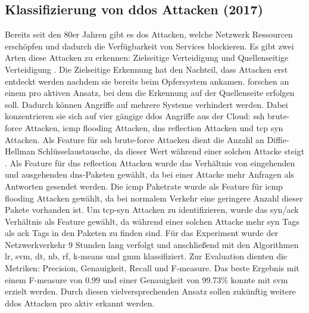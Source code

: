 \documentclass[
    12pt, %
    DIV10,
    ngerman, %
    a4paper, %
    oneside, %
    titlepage, %
    parskip=half, %
    headings=normal, %
    listof=totoc, %
    bibliography=totoc, %
    index=totoc, %
    captions=tableheading, %
    final %
]{scrreprt}
\begin{document}
\subsection{Klassifizierung von \acs{ddos} Attacken (2017)}
Bereits seit den 80er Jahren gibt es \ac{dos} Attacken, welche Netzwerk Ressourcen erschöpfen und dadurch die Verfügbarkeit von Services blockieren. Es gibt zwei Arten diese Attacken zu erkennen: Zielseitige Verteidigung und Quellenseitige Verteidigung \parencite{He2017}. Die Zielseitige Erkennung hat den Nachteil, dass Attacken erst entdeckt werden nachdem sie bereits beim Opfersystem ankamen. \textcite{He2017} forschen an einem pro aktiven Ansatz, bei dem die Erkennung auf der Quellenseite erfolgen soll. Dadurch können Angriffe auf mehrere Systeme verhindert werden. Dabei konzentrieren sie sich auf vier gängige \ac{ddos} Angriffe aus der Cloud: \ac{ssh} brute-force Attacken, \ac{icmp} flooding Attacken, \ac{dns} reflection Attacken und \ac{tcp} \ac{syn} Attacken. Als Feature für \ac{ssh} brute-force Attacken dient die Anzahl an Diffie-Hellman Schlüsselaustausche, da dieser Wert während einer solchen Attacke steigt \parencite{He2017}. Als Feature für \ac{dns} reflection Attacken wurde das Verhältnis von eingehenden und ausgehenden \ac{dns}-Paketen gewählt, da bei einer Attacke mehr Anfragen als Antworten gesendet werden. Die \ac{icmp} Paketrate wurde als Feature für \ac{icmp} flooding Attacken gewählt, da bei normalem Verkehr eine geringere Anzahl dieser Pakete vorhanden ist. Um \ac{tcp}-\ac{syn} Attacken zu identifizieren, wurde das \ac{syn}/\ac{ack} Verhältnis als Feature gewählt, da während einer solchen Attacke mehr \ac{syn} Tags als \ac{ack} Tags in den Paketen zu finden sind. Für das Experiment wurde der Netzwerkverkehr 9 Stunden lang verfolgt und anschlie{\ss}end mit den Algorithmen \ac{lr}, \ac{svm}, \ac{dt}, \ac{nb}, \ac{rf}, k-means und \ac{gmm} klassifiziert. Zur Evaluation dienten die Metriken: Precision, Genauigkeit, Recall und F-measure. Das beste Ergebnis mit einem F-measure von 0.99 und einer Genauigkeit von 99.73\% konnte mit \ac{svm} erzielt werden.
Durch diesen vielversprechenden Ansatz sollen zukünftig weitere \ac{ddos} Attacken pro aktiv erkannt werden.
%
\end{document}
